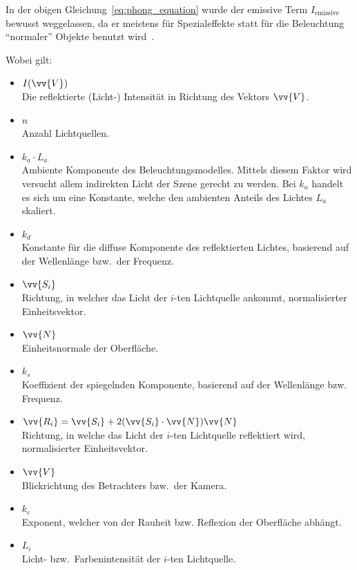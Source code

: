 In der obigen Gleichung~\ref{eq:phong_equation} wurde der emissive Term
$I_{\text{emissive}}$ bewusst weggelassen, da er meistens für
Spezialeffekte statt für die Beleuchtung ``normaler'' Objekte benutzt
wird~\parencite{hughes_computer_2013}.

Wobei gilt:

\begin{itemize}
    \item $I(\vv{V})$\\
        Die reflektierte (Licht-) Intensität in Richtung des Vektors
        $\vv{V}$.

    \item $n$\\
        Anzahl Lichtquellen.

    \item $k_{a} \cdot L_{a}$\\
        Ambiente Komponente des Beleuchtungsmodelles. Mittels diesem
        Faktor wird versucht allem indirekten Licht der Szene gerecht zu
        werden. Bei $k_{a}$ handelt es sich um eine Konstante, welche
        den ambienten Anteils des Lichtes $L_{a}$ skaliert.

    \item $k_{d}$\\
        Konstante für die diffuse Komponente des reflektierten Lichtes,
        basierend auf der Wellenlänge bzw.\ der Frequenz.

    \item $\vv{S_{i}}$\\
        Richtung, in welcher das Licht der $i$-ten Lichtquelle ankommt,
        normalisierter Einheitsvektor.

    \item $\vv{N}$\\
        Einheitsnormale der Oberfläche.

    \item $k_{s}$\\
        Koeffizient der spiegelnden Komponente, basierend auf der
        Wellenlänge bzw. Frequenz.

    \item $\vv{R_{i}} = \vv{S_{i}} + 2(\vv{S_{i}} \cdot \vv{N})\vv{N}$\\
        Richtung, in welche das Licht der $i$-ten Lichtquelle
        reflektiert wird, normalisierter Einheitsvektor.

    \item $\vv{V}$\\
        Blickrichtung des Betrachters bzw.\ der Kamera.

    \item $k_{e}$\\
        Exponent, welcher von der Rauheit
        bzw.  Reflexion der Oberfläche abhängt.
    \item $L_{i}$\\
        Licht- bzw.\ Farbenintensität der $i$-ten Lichtquelle.
\end{itemize}

